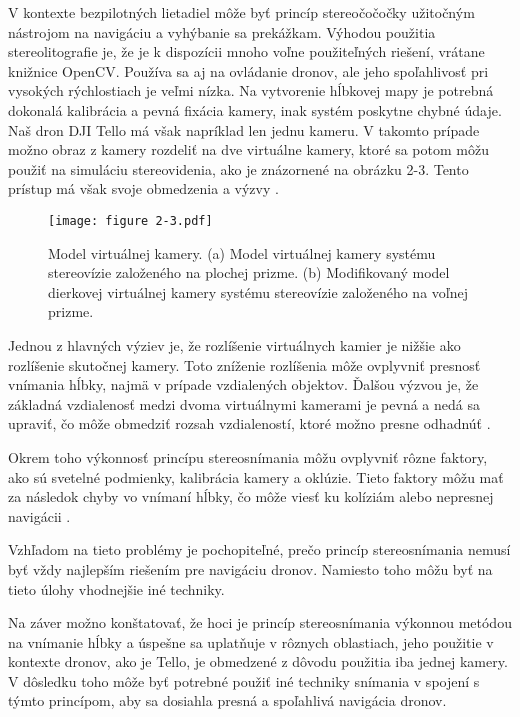 V kontexte bezpilotných lietadiel môže byť princíp stereočočočky užitočným nástrojom na navigáciu a vyhýbanie sa prekážkam. Výhodou použitia stereolitografie je, že je k dispozícii mnoho voľne použiteľných riešení, vrátane knižnice OpenCV. Používa sa aj na ovládanie dronov, ale jeho spoľahlivosť pri vysokých rýchlostiach je veľmi nízka. Na vytvorenie hĺbkovej mapy je potrebná dokonalá kalibrácia a pevná fixácia kamery, inak systém poskytne chybné údaje. Naš dron DJI Tello má však napríklad len jednu kameru. V takomto prípade možno obraz z kamery rozdeliť na dve virtuálne kamery, ktoré sa potom môžu použiť na simuláciu stereovidenia, ako je znázornené na obrázku 2-3. Tento prístup má však svoje obmedzenia a výzvy \citep{brzozowski2018stereo}.

\begin{figure}[ht!]
    \centering
    \texttt{[image: figure 2-3.pdf]}
    \caption{Model virtuálnej kamery. (a) Model virtuálnej kamery systému stereovízie založeného na plochej prizme. (b) Modifikovaný model dierkovej virtuálnej kamery systému stereovízie založeného na voľnej prizme.}
    \label{o:2-3}
\end{figure}

Jednou z hlavných výziev je, že rozlíšenie virtuálnych kamier je nižšie ako rozlíšenie skutočnej kamery. Toto zníženie rozlíšenia môže ovplyvniť presnosť vnímania hĺbky, najmä v prípade vzdialených objektov. Ďalšou výzvou je, že základná vzdialenosť medzi dvoma virtuálnymi kamerami je pevná a nedá sa upraviť, čo môže obmedziť rozsah vzdialeností, ktoré možno presne odhadnúť \citep{cui2019design}.

Okrem toho výkonnosť princípu stereosnímania môžu ovplyvniť rôzne faktory, ako sú svetelné podmienky, kalibrácia kamery a oklúzie. Tieto faktory môžu mať za následok chyby vo vnímaní hĺbky, čo môže viesť ku kolíziám alebo nepresnej navigácii \citep{cui2019design}.

Vzhľadom na tieto problémy je pochopiteľné, prečo princíp stereosnímania nemusí byť vždy najlepším riešením pre navigáciu dronov. Namiesto toho môžu byť na tieto úlohy vhodnejšie iné techniky.

Na záver možno konštatovať, že hoci je princíp stereosnímania výkonnou metódou na vnímanie hĺbky a úspešne sa uplatňuje v rôznych oblastiach, jeho použitie v kontexte dronov, ako je Tello, je obmedzené z dôvodu použitia iba jednej kamery. V dôsledku toho môže byť potrebné použiť iné techniky snímania v spojení s týmto princípom, aby sa dosiahla presná a spoľahlivá navigácia dronov.

